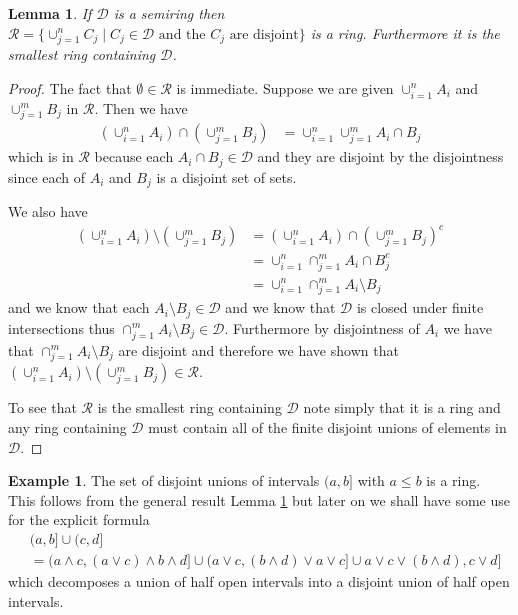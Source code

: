 \documentclass{amsart}
\newtheorem{lem}[thm]{Lemma}
\theoremstyle{remark}
\theoremstyle{definition}
\newtheorem{examp}[thm]{Example}
\begin{document}
\begin{lem}\label{RingFromSemiring}If $\mathcal{D}$ is a semiring then $\mathcal{R} = \lbrace
  \cup_{j=1}^n C_j \mid C_j \in \mathcal{D} \text{ and the $C_j$ are
    disjoint} \rbrace$ is a ring.  Furthermore it is the smallest ring
  containing $\mathcal{D}$.
\end{lem}
\begin{proof}
The fact that $\emptyset \in \mathcal{R}$ is immediate.  Suppose we
are given $\cup_{i=1}^n A_i$ and $\cup_{j=1}^m B_j$ in
$\mathcal{R}$. Then we have
\begin{align}
\left ( \cup_{i=1}^n A_i \right ) \cap \left ( \cup_{j=1}^m B_j \right
) &= \cup_{i=1}^n \cup_{j=1}^m A_i \cap B_j
\end{align}
which is in $\mathcal{R}$ because each $A_i \cap B_j \in \mathcal{D}$
and they are disjoint by the disjointness since each of $A_i$ and
$B_j$ is a disjoint set of sets.  

We also have 
\begin{align}
\left ( \cup_{i=1}^n A_i \right ) \setminus \left ( \cup_{j=1}^m B_j \right
) &=\left ( \cup_{i=1}^n A_i \right ) \cap \left ( \cup_{j=1}^m B_j \right
)^c \\
&=\cup_{i=1}^n \cap_{j=1}^m A_i \cap B_j^c \\
&=\cup_{i=1}^n \cap_{j=1}^m A_i \setminus B_j
\end{align}
and we know that each $A_i \setminus B_j \in \mathcal{D}$ and we know
that $\mathcal{D}$ is closed under finite intersections thus
$\cap_{j=1}^m A_i \setminus B_j \in \mathcal{D}$.  Furthermore by
disjointness of $A_i$ we have that $\cap_{j=1}^m A_i \setminus B_j$
are disjoint and therefore we have shown that $\left ( \cup_{i=1}^n A_i \right ) \setminus \left ( \cup_{j=1}^m B_j \right
) \in \mathcal{R}$.

To see that $\mathcal{R}$ is the smallest ring containing
$\mathcal{D}$ note simply that it is a ring and any ring containing
$\mathcal{D}$ must contain all of the finite disjoint unions of
elements in $\mathcal{D}$.
\end{proof}

\begin{examp}\label{RingOfDisjointUnionHalfOpenIntervals}The set of disjoint unions of intervals $(a,b]$ with $a \leq b$ is a
  ring.  This follows from the general result Lemma
  \ref{RingFromSemiring} but later on we shall have some use for the
  explicit formula
\begin{align*}
&(a,b] \cup (c,d] \\
&= (a \wedge c, (a \vee c) \wedge b \wedge d] \cup (a \vee c, (b
\wedge d) \vee a \vee c]
\cup a \vee c \vee (b \wedge d), c \vee d]
\end{align*}
which decomposes a union of half open intervals into a disjoint union
of half open intervals.
\end{examp}
 
\end{document}
